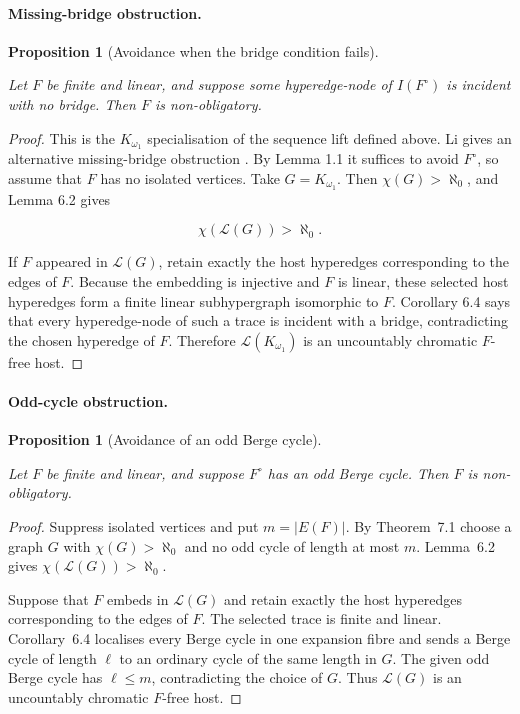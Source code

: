 \documentclass[a4paper,11pt,reqno]{amsart}
\theoremstyle{plain}
\newtheorem{proposition}[theorem]{Proposition}
\theoremstyle{definition}
\theoremstyle{remark}
\begin{document}
\paragraph{Missing-bridge obstruction.}\label{missing-bridge-obstruction}

\begin{proposition}[Avoidance when the bridge condition fails]\label{proposition-8.2-avoidance-when-the-bridge-condition-fails}

Let \(F\) be finite and linear, and suppose some hyperedge-node of \(I(F^\circ)\) is incident with no bridge. Then \(F\) is non-obligatory.

\end{proposition}
\begin{proof}
This is the $K_{\omega_1}$ specialisation of the sequence lift defined above.
Li gives an alternative missing-bridge obstruction \citep[Section~4]{li2026}.
By Lemma 1.1 it suffices to avoid \(F^\circ\),
so assume that \(F\) has no isolated vertices.
Take \(G=K_{\omega_1}\). Then \(\chi(G)>\aleph_0\), and Lemma 6.2 gives

\[
\chi(\mathcal L(G))>\aleph_0.
\]

If \(F\) appeared in \(\mathcal L(G)\), retain exactly the host hyperedges corresponding to the edges of \(F\). Because the embedding is injective and \(F\) is linear, these selected host hyperedges form a finite linear subhypergraph isomorphic to \(F\). Corollary 6.4 says that every hyperedge-node of such a trace is incident with a bridge, contradicting the chosen hyperedge of \(F\). Therefore \(\mathcal L(K_{\omega_1})\) is an uncountably chromatic \(F\)-free host.
\end{proof}

\paragraph{Odd-cycle obstruction.}\label{odd-cycle-obstruction}

\begin{proposition}[Avoidance of an odd Berge cycle]\label{proposition-8.3-avoidance-of-an-odd-berge-cycle}

Let \(F\) be finite and linear, and suppose \(F^\circ\) has an odd Berge cycle. Then \(F\) is non-obligatory.

\end{proposition}
\begin{proof}
Suppress isolated vertices and put $m=|E(F)|$.  By Theorem~7.1 choose a graph
$G$ with $\chi(G)>\aleph_0$ and no odd cycle of length at most $m$.  Lemma~6.2
gives $\chi(\mathcal L(G))>\aleph_0$.

Suppose that $F$ embeds in $\mathcal L(G)$ and retain exactly the host
hyperedges corresponding to the edges of $F$.  The selected trace is finite
and linear.  Corollary~6.4 localises every Berge cycle in one expansion fibre
and sends a Berge cycle of length $\ell$ to an ordinary cycle of the same
length in $G$.  The given odd Berge cycle has $\ell\le m$, contradicting the
choice of $G$.  Thus $\mathcal L(G)$ is an uncountably chromatic $F$-free
host.
\end{proof}
\end{document}
